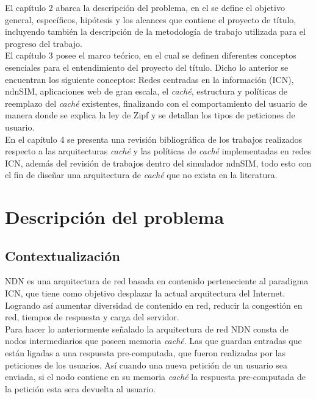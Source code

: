 \documentclass[12pt]{ociamthesis}  %
\begin{document}
El capítulo 2 abarca la descripción del problema, en el se define el objetivo general, específicos, hipótesis y los alcances que contiene el proyecto de título, incluyendo también la descripción de la metodología de trabajo utilizada para el progreso del trabajo.\\

El capítulo 3 posee el marco teórico, en el cual se definen diferentes conceptos esenciales para el entendimiento del proyecto del título. Dicho lo anterior se encuentran los siguiente conceptos: Redes centradas en la información (ICN), ndnSIM, aplicaciones web de gran escala, el \textit{caché}, estructura y políticas de reemplazo del \textit{caché} existentes, finalizando con el comportamiento del usuario de manera donde se explica la ley de Zipf y se detallan los tipos de peticiones de usuario.\\

En el capítulo 4 se presenta una revisión bibliográfica de los trabajos realizados respecto a las arquitecturas \textit{caché} y las políticas de \textit{caché} implementadas en redes ICN, además del revisión de trabajos dentro del simulador ndnSIM, todo esto con el fin de diseñar una arquitectura de \textit{caché} que no exista en la literatura.\\

\chapter{Descripción del problema}
\section{Contextualización}
NDN es una arquitectura de red basada en contenido perteneciente al paradigma ICN, que tiene como objetivo desplazar la actual arquitectura del Internet. Logrando así aumentar diversidad de contenido en red, reducir la congestión en red, tiempos de respuesta y carga del servidor.\\

Para hacer lo anteriormente señalado la arquitectura de red NDN consta de nodos intermediarios que poseen memoria \textit{caché}. Las que guardan entradas que están ligadas a una respuesta pre-computada, que fueron realizadas por las peticiones de los usuarios. Así cuando una nueva petición de un usuario sea enviada, si el nodo contiene en su memoria \textit{caché} la respuesta pre-computada de la petición esta sera devuelta al usuario.\\
\end{document}
